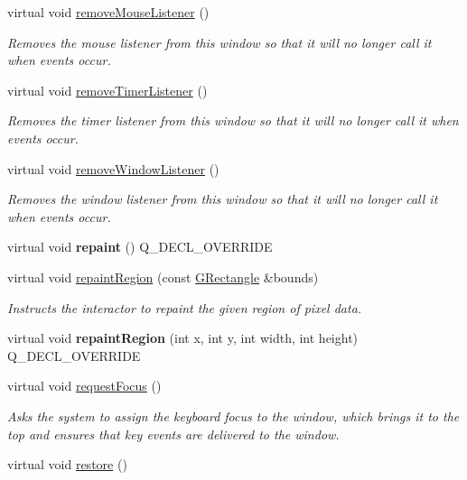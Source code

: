 \begin{DoxyCompactItemize}
virtual void \mbox{\hyperlink{classGWindow_aff47f71ce47e688a07c9d38dc92fcc11}{remove\+Mouse\+Listener}} ()
\begin{DoxyCompactList}\small\item\em Removes the mouse listener from this window so that it will no longer call it when events occur. \end{DoxyCompactList}\item 
virtual void \mbox{\hyperlink{classGWindow_a8ca9bf0f8dfd3755d73d07ee01e3455f}{remove\+Timer\+Listener}} ()
\begin{DoxyCompactList}\small\item\em Removes the timer listener from this window so that it will no longer call it when events occur. \end{DoxyCompactList}\item 
virtual void \mbox{\hyperlink{classGWindow_ab1ea252520cc160b329cfb5b038add83}{remove\+Window\+Listener}} ()
\begin{DoxyCompactList}\small\item\em Removes the window listener from this window so that it will no longer call it when events occur. \end{DoxyCompactList}\item 
virtual void {\bfseries repaint} () Q\+\_\+\+D\+E\+C\+L\+\_\+\+O\+V\+E\+R\+R\+I\+DE
\item 
virtual void \mbox{\hyperlink{classGDrawingSurface_a769c46fb3e1004aec76e8b0adfa42aa6}{repaint\+Region}} (const \mbox{\hyperlink{classGRectangle}{G\+Rectangle}} \&bounds)
\begin{DoxyCompactList}\small\item\em Instructs the interactor to repaint the given region of pixel data. \end{DoxyCompactList}\item 
virtual void {\bfseries repaint\+Region} (int x, int y, int width, int height) Q\+\_\+\+D\+E\+C\+L\+\_\+\+O\+V\+E\+R\+R\+I\+DE
\item 
virtual void \mbox{\hyperlink{classGWindow_a519fb2ac767f8b2febbb50b898b8c8cb}{request\+Focus}} ()
\begin{DoxyCompactList}\small\item\em Asks the system to assign the keyboard focus to the window, which brings it to the top and ensures that key events are delivered to the window. \end{DoxyCompactList}\item 
virtual void \mbox{\hyperlink{classGWindow_afd3595051be2709847c2de4352f27cf5}{restore}} ()

\end{DoxyCompactItemize}
